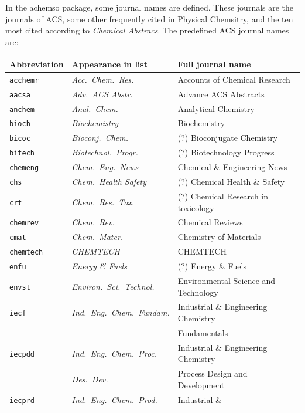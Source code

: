 \documentclass{article}
\begin{document}
In the \textsf{achemso} package, some journal names are defined. These
journals are the journals of ACS, some other frequently cited in Physical
Chemsitry, and the ten most cited according to \textit{Chemical Abstracs}.
The predefined ACS journal names are:\\[\baselineskip]
\begin{tabular}{|lll|}
\hline
Abbreviation & Appearance in list & Full journal name \\ \hline
\texttt{acchemr} & \textit{Acc.\ Chem.\ Res.} & Accounts of Chemical Research
\\ 
\texttt{aacsa} & \textit{Adv.\ {ACS} Abstr.} & Advance ACS Abstracts \\ 
\texttt{anchem} & \textit{Anal.\ Chem.} & Analytical Chemistry \\ 
\texttt{bioch} & \textit{Biochemistry} & Biochemistry \\ 
\texttt{bicoc} & \textit{Bioconj.\ Chem.} & (?) Bioconjugate Chemistry \\ 
\texttt{bitech} & \textit{Biotechnol.\ Progr.} & (?) Biotechnology Progress
\\ 
\texttt{chemeng} & \textit{Chem.\ Eng.\ News} & Chemical \&{} Engineering
News \\ 
\texttt{chs} & \textit{Chem.\ Health Safety} & (?) Chemical Health \&{}
Safety \\ 
\texttt{crt} & \textit{Chem.\ Res.\ Tox.} & (?) Chemical Research in
toxicology \\ 
\texttt{chemrev} & \textit{Chem.\ Rev.} & Chemical Reviews \\ 
\texttt{cmat} & \textit{Chem.\ Mater.} & Chemistry of Materials \\ 
\texttt{chemtech} & \textit{CHEMTECH} & CHEMTECH \\ 
\texttt{enfu} & \textit{Energy \&{} Fuels} & (?) Energy \&{} Fuels \\ 
\texttt{envst} & \textit{Environ.\ Sci.\ Technol.} & Environmental Science
and Technology \\ 
\texttt{iecf} & \textit{Ind.\ Eng.\ Chem.\ Fundam.} & Industrial \&{}
Engineering Chemistry \\ 
&  & \hfill Fundamentals \\ 
\texttt{iecpdd} & \textit{Ind.\ Eng.\ Chem.\ Proc.} & Industrial \&{}
Engineering Chemistry \\ 
& \hfill\textit{Des.\ Dev.} & \hfill Process Design and Development \\ 
\texttt{iecprd} & \textit{Ind.\ Eng.\ Chem.\ Prod.} & Industrial \&{}

\end{tabular}
\end{document}
